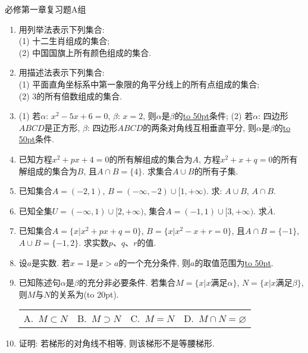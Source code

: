 \documentclass[10pt,a4paper]{article}
\newcommand{\blank}[1]{\underline{\hbox to #1pt{}}}
\newcommand{\bracket}[1]{(\hbox to #1pt{})}
\newcommand{\fourch}[4]{\par\begin{tabular}{p{.23\textwidth}p{.23\textwidth}p{.23\textwidth}p{.23\textwidth}}
A.~#1 &B.~#2& C.~#3& D.~#4
\end{tabular}}
\begin{document}
必修第一章复习题A组
\begin{enumerate}[1.]
\item 用列举法表示下列集合:\\
(1) 十二生肖组成的集合;\\
(2) 中国国旗上所有颜色组成的集合.
\vspace*{3cm}
\item 用描述法表示下列集合:\\
(1) 平面直角坐标系中第一象限的角平分线上的所有点组成的集合;\\
(2) $3$的所有倍数组成的集合.
\vspace*{3cm}
\item (1) 若$\alpha$: $x^2-5x+6=0$, $\beta$: $x=2$, 则$\alpha$是$\beta$的\blank{50}条件;
(2) 若$\alpha$: 四边形$ABCD$是正方形, $\beta$: 四边形$ABCD$的两条对角线互相垂直平分, 则$\alpha$是$\beta$的\blank{50}条件.
\vspace*{3cm}
\item 已知方程$x^2+px+4=0$的所有解组成的集合为$A$, 方程$x^2+x+q=0$的所有解组成的集合为$B$, 且$A\cap B=\{4\}$. 求集合$A\cup B$的所有子集.
\vspace*{3cm}
\item 已知集合$A=(-2, 1)$, $B=(-\infty, -2)\cup [1, +\infty)$. 求: $A\cup B$, $A\cap B$.
\vspace*{3cm}
\item 已知全集$U=(-\infty, 1)\cup [2, +\infty)$, 集合$A=(-1, 1)\cup [3, +\infty)$. 求$\overline{A}$.
\vspace*{3cm}
\item 已知集合$A=\{x|x^2+px+q=0\}$, $B=\{x|x^2-x+r=0\}$, 且$A\cap B=\{-1\}$, $A\cup B=\{-1, 2\}$. 求实数$p$、$q$、$r$的值.
\vspace*{3cm}
\item 设$a$是实数. 若$x=1$是$x>a$的一个充分条件, 则$a$的取值范围为\blank{50}.
\vspace*{3cm}
\item 已知陈述句$\alpha$是$\beta$的充分非必要条件. 若集合$M=\{x|x\text{满足}\alpha\}$, $N=\{x|x\text{满足}\beta\}$, 则$M$与$N$的关系为\bracket{20}.
\fourch{$M\subset N$}{$M\supset N$}{$M=N$}{$M\cap N=\varnothing$}
\vspace*{3cm}
\item 证明: 若梯形的对角线不相等, 则该梯形不是等腰梯形.
\vspace*{3cm}
\end{enumerate}
\end{document}
